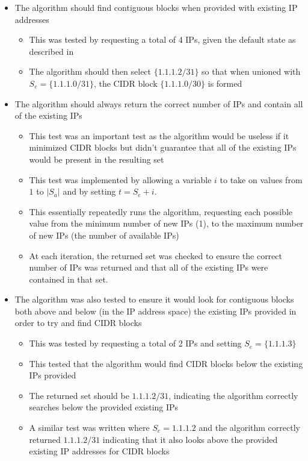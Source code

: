 \begin{itemize}
\item{The algorithm should find contiguous blocks when provided with existing IP addresses}
      \begin{itemize}
      \item{This was tested by requesting a total of 4 IPs, given the default state as described in }
      \item{The algorithm should then select $\{1.1.1.2/31\}$} so that when unioned with $S_e = \{1.1.1.0/31\}$, the CIDR block $\{1.1.1.0/30\}$  is formed 
      \end{itemize}
\item{The algorithm should always return the correct number of IPs and contain all of the existing IPs}
      \begin{itemize}
      \item{This test was an important test as the algorithm would be useless if it minimized CIDR blocks but didn't guarantee that all of the existing IPs would be present in the resulting set}
      \item{This test was implemented by allowing a variable $i$ to take on values from $1$ to $|S_a|$ and by setting $t = S_e + i$.}
      \item{This essentially repeatedly runs the algorithm, requesting each possible value from the minimum number of new IPs (1), to the maximum number of new IPs (the number of available IPs)}
      \item{At each iteration, the returned set was checked to ensure the correct number of IPs was returned and that all of the existing IPs were contained in that set.}
      \end{itemize}
\item{The algorithm was also tested to ensure it would look for contiguous blocks both above and below (in the IP address space) the existing IPs provided in order to try and find CIDR blocks}
      \begin{itemize}
      \item{This was tested by requesting a total of 2 IPs and setting $S_e = \{1.1.1.3\}$}
      \item{This tested that the algorithm would find CIDR blocks below the existing IPs provided}
      \item{The returned set should be $1.1.1.2/31$, indicating the algorithm correctly searches below the provided existing IPs}
      \item{A similar test was written where $S_e = {1.1.1.2}$ and the algorithm correctly returned $1.1.1.2/31$ indicating that it also looks above the provided existing IP addresses for CIDR blocks}

\end{itemize}
\end{itemize}
